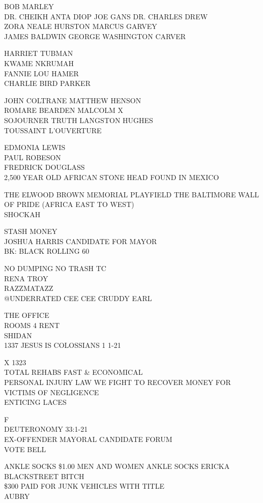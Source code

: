 \documentclass[10pt,letterpaper]{article}
\begin{document}
BOB MARLEY\\
DR. CHEIKH ANTA DIOP JOE GANS DR. CHARLES DREW\\
ZORA NEALE HURSTON MARCUS GARVEY\\
JAMES BALDWIN GEORGE WASHINGTON CARVER

HARRIET TUBMAN\\
KWAME NKRUMAH\\
FANNIE LOU HAMER\\
CHARLIE BIRD PARKER

JOHN COLTRANE MATTHEW HENSON\\
ROMARE BEARDEN MALCOLM X\\
SOJOURNER TRUTH LANGSTON HUGHES\\
TOUSSAINT L'OUVERTURE

EDMONIA LEWIS\\
PAUL ROBESON\\
FREDRICK DOUGLASS\\
2,500 YEAR OLD AFRICAN STONE HEAD FOUND IN MEXICO

THE ELWOOD BROWN MEMORIAL PLAYFIELD THE BALTIMORE WALL OF PRIDE (AFRICA EAST TO WEST)\\
SHOCKAH

STASH MONEY\\
JOSHUA HARRIS CANDIDATE FOR MAYOR\\
BK: BLACK ROLLING 60

NO DUMPING NO TRASH TC\\
RENA TROY\\
RAZZMATAZZ\\
@UNDERRATED CEE CEE CRUDDY EARL

THE OFFICE\\
ROOMS 4 RENT\\
SHIDAN\\
1337 JESUS IS COLOSSIANS 1 1{-}21

X 1323\\
TOTAL REHABS FAST \& ECONOMICAL\\
PERSONAL INJURY LAW WE FIGHT TO RECOVER MONEY FOR VICTIMS OF NEGLIGENCE\\
ENTICING LACES

F\\
DEUTERONOMY 33:1{-}21\\
EX{-}OFFENDER MAYORAL CANDIDATE FORUM\\
VOTE BELL

ANKLE SOCKS \$1.00 MEN AND WOMEN ANKLE SOCKS ERICKA\\
BLACKSTREET BITCH\\
\$300 PAID FOR JUNK VEHICLES WITH TITLE\\
AUBRY
\end{document}
